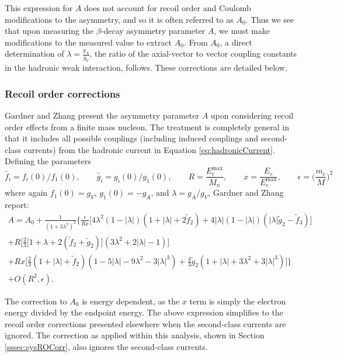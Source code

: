 This expression for $A$ does not account for recoil order and Coulomb modifications to the asymmetry, and so it is
often referred to as $A_0$. Thus we see that upon measuring the $\beta$-decay
asymmetry parameter $A$, we must make modifications to the measured value to extract
$A_0$. From $A_0$, a direct determination of $\lambda = \frac{g_A}{g_V}$, the ratio of the axial-vector to vector
coupling constants in the hadronic weak interaction, follows.
These corrections are detailed below.

\subsubsection{Recoil order corrections}  \label{sssec:ROCorr}

Gardner and Zhang \cite{gardner2001} present the asymmetry parameter $A$ upon considering recoil order effects
from a finite mass nucleon. The treatment is completely general in that it includes all possible couplings
(including induced couplings and second-class currents) from the hadronic current in Equation
\ref{eq:hadronicCurrent}. Defining the parameters
%
\begin{equation*}
  \tilde{f_i}=f_i(0)/f_1(0),\qquad  \tilde{g_i}=g_i(0)/g_1(0), \qquad
  R=\frac{E^{\mathrm{max}}_e}{M_n}, \qquad x = \frac{E_e}{E^{\mathrm{max}}_e}, \qquad \epsilon=\Big(\frac{m_e}{M}\Big)^2
\end{equation*}
where again $f_1(0)=g_V$, $g_1(0)=-g_A$, and $\lambda=g_A/g_V$, Gardner and Zhang report:
%
\begin{multline}
  A = A_0 + \frac{1}{(1+3\lambda^2)^2}\Bigg\{\frac{\epsilon}{Rx}\Big[4\lambda^2
      (1-|\lambda|)(1+|\lambda|+2\tilde{f}_2)+4|\lambda|(1-|\lambda|)
      (|\lambda|\tilde{g}_2-\tilde{f}_3)\Big] \\
    + R\bigg[\frac{2}{3}\big[1+\lambda+2(\tilde{f}_2+\tilde{g}_2)\big]
      (3\lambda^2+2|\lambda|-1)\bigg] \\
      +Rx\bigg[\frac{2}{3}(1+|\lambda| + \tilde{f}_2)
        (1-5|\lambda|-9\lambda^2-3|\lambda|^3)
        +\frac{4}{3}\tilde{g}_2(1+|\lambda|+3\lambda^2+3|\lambda|^3)\bigg]\Bigg\} \\
  +O(R^2,\epsilon).
\end{multline}

The correction to $A_0$ is energy dependent, as the $x$ term is simply the electron energy divided by
the endpoint energy. The above expression simplifies to the recoil order corrections
presented elsewhere \cite{bilenkii1960,wilkinson1982} when the second-class currents
are ignored. The correction as applied within this analysis, shown in Section \ref{sssec:sysROCorr},
also ignores the second-class currents.

